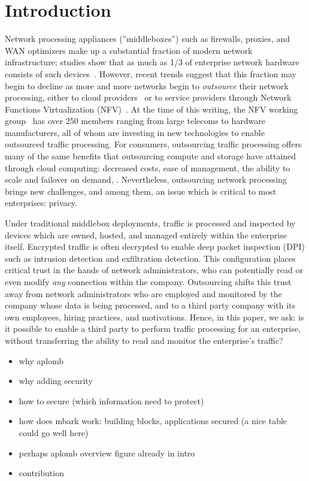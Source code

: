 

\section{Introduction}\label{sec:intro}



    Network processing appliances (''middleboxes'') such as firewalls, proxies, and WAN optimizers make up a substantial fraction of modern network infrastructure; studies show that as much as 1/3 of enterprise network hardware consists of such devices~\cite{aplomb}.
    However, recent trends suggest that this fraction may begin to decline as more and more networks begin to {\it outsource} their network processing, either to cloud providers~\cite{aplomb, aryaka, zscalar} or to service providers through Network Functions Virtualization (NFV)~\cite{nfv}.
    At the time of this writing, the NFV working group~\cite{nfvwg} has over 250 members ranging from large telecoms to hardware manufacturers, all of whom are investing in new technologies to enable outsourced traffic processing.
    For consumers, outsourcing traffic processing offers many of the same benefits that outsourcing compute and storage have attained through cloud computing: decreased costs, ease of management, the ability to scale and failover on demand, \etc{}.
    Nevertheless, outsourcing network processing brings new challenges, and among them, an issue which is critical to most enterprises: privacy.
    
    Under traditional middlebox deployments, traffic is processed and inspected by devices which are owned, hosted, and managed entirely within the enterprise itself.
    Encrypted traffic is often decrypted to enable deep packet inspection (DPI) such as intrusion detection and exfiltration detection.
    This configuration places critical trust in the hands of network administrators, who can potentially read or even modify {\it any} connection within the company.
    Outsourcing shifts this trust away from network administrators who are employed and monitored by the company whose data is being processed, and to a third party company with its own employees, hiring practices, and motivations.
    Hence, in this paper, we ask: is it possible to enable a third party to perform traffic processing for an enterprise, without transferring the ability to read and monitor the enterprise's traffic?
    
    


\begin{itemize}
\item why aplomb
\item why adding security
\item how to secure (which information need to protect)
\item how does mbark work: building blocks, applications secured (a nice table could go well here)
\item perhaps aplomb overview figure already in intro
\item contribution
\end{itemize}
